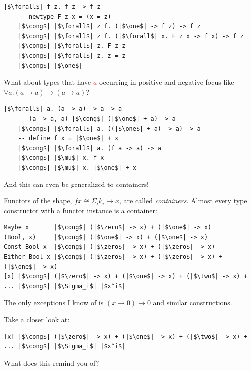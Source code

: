 \documentclass[tikz]{beamer}
\newcommand{\zero}{\bm{\mathbb{0}}}
\newcommand{\one}{\bm{\mathbb{1}}}
\newcommand{\two}{\bm{\mathbb{2}}}
\newcommand{\mred}[1]{\textcolor{red}{$#1$}}
\theoremstyle{definition}
\begin{document}
\begin{frame}[fragile]

\begin{verbatim}
|$\forall$| f z. f z -> f z
    -- newtype F z x = (x = z)
    |$\cong$| |$\forall$| z f. (|$\one$| -> f z) -> f z
    |$\cong$| |$\forall$| z f. (|$\forall$| x. F z x -> f x) -> f z
    |$\cong$| |$\forall$| z. F z z
    |$\cong$| |$\forall$| z. z = z
    |$\cong$| |$\one$|
\end{verbatim}
\end{frame}

\frame
{
	What about types that have \mred{a} occurring in positive and negative focus like $\forall a. (a \to a) \to (a \to a)$?
}

\begin{frame}[fragile]
\begin{verbatim}
|$\forall$| a. (a -> a) -> a -> a
    -- (a -> a, a) |$\cong$| (|$\one$| + a) -> a
    |$\cong$| |$\forall$| a. ((|$\one$| + a) -> a) -> a
    -- define f x = |$\one$| + x
    |$\cong$| |$\forall$| a. (f a -> a) -> a
    |$\cong$| |$\mu$| x. f x
    |$\cong$| |$\mu$| x. |$\one$| + x
\end{verbatim}
\end{frame}

\frame
{
	And this can even be generalized to containers!
}

\begin{frame}[fragile]
Functors of the shape, $f x \cong \Sigma_i k_i \to x$, are called {\em containers}. Almost every type constructor with a functor instance is a container:
\begin{verbatim}
Maybe x       |$\cong$| (|$\zero$| -> x) + (|$\one$| -> x)
(Bool, x)     |$\cong$| (|$\one$| -> x) + (|$\one$| -> x)
Const Bool x  |$\cong$| (|$\zero$| -> x) + (|$\zero$| -> x)
Either Bool x |$\cong$| (|$\zero$| -> x) + (|$\zero$| -> x) + (|$\one$| -> x)
[x] |$\cong$| (|$\zero$| -> x) + (|$\one$| -> x) + (|$\two$| -> x) + ... |$\cong$| |$\Sigma_i$| |$x^i$|
\end{verbatim}

The only exceptions I know of is $(x \to 0) \to 0$ and similar constructions.
\end{frame}

\begin{frame}[fragile]
Take a closer look at:
\begin{verbatim}
[x] |$\cong$| (|$\zero$| -> x) + (|$\one$| -> x) + (|$\two$| -> x) + ... |$\cong$| |$\Sigma_i$| |$x^i$|
\end{verbatim}
What does this remind you of?
\end{frame}
\end{document}
